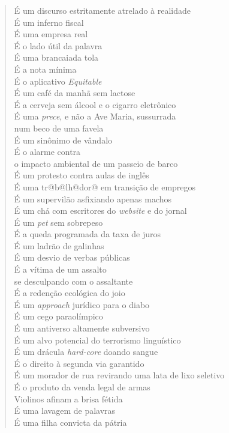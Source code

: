 \begin{verse}
É um discurso estritamente atrelado à realidade\\
É um inferno fiscal\\
É uma empresa real\\
É o lado útil da palavra\\[5pt]
É uma brancaiada tola\\
É a nota mínima\\
É o aplicativo \emph{Equitable}\\
É um café da manhã sem lactose\\[5pt]
É a cerveja sem álcool e o cigarro eletrônico\\
É uma \emph{prece}, e não a Ave Maria, sussurrada\\
num beco de uma favela\\
É um sinônimo de vândalo\\[5pt]
É o alarme contra\\
o impacto ambiental de um passeio de barco\\
É um protesto contra aulas de inglês\\
É uma tr@b@lh@dor@ em transição de empregos\\[5pt]
É um supervilão asfixiando apenas machos\\
É um chá com escritores do \emph{website} e do jornal\\
É um \emph{pet} sem sobrepeso\\
É a queda programada da taxa de juros\\[5pt]
É um ladrão de galinhas\\
É um desvio de verbas públicas\\
É a vítima de um assalto\\
se desculpando com o assaltante\\[5pt]
É a redenção ecológica do joio\\
É um \emph{approach} jurídico para o diabo\\
É um cego paraolímpico\\
É um antiverso altamente subversivo\\[5pt]
É um alvo potencial do terrorismo linguístico\\
É um drácula \emph{hard-core} doando sangue\\
É o direito à segunda via garantido\\
É um morador de rua revirando uma lata de lixo seletivo\\[5pt]
É o produto da venda legal de armas\\
Violinos afinam a brisa fétida\\
É uma lavagem de palavras\\
É uma filha convicta da pátria
\end{verse}

